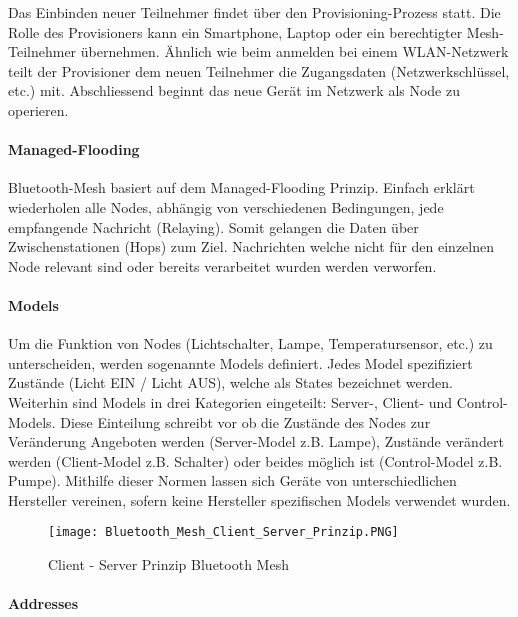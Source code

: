 Das Einbinden neuer Teilnehmer findet über den Provisioning-Prozess statt. Die Rolle des Provisioners kann ein Smartphone, Laptop oder ein berechtigter Mesh-Teilnehmer übernehmen. Ähnlich wie beim anmelden bei einem WLAN-Netzwerk teilt der Provisioner dem neuen Teilnehmer die Zugangsdaten (Netzwerkschlüssel, etc.) mit. Abschliessend beginnt das neue Gerät im Netzwerk als Node zu operieren. 

\paragraph{Managed-Flooding}

Bluetooth-Mesh basiert auf dem Managed-Flooding Prinzip. Einfach erklärt wiederholen alle Nodes, abhängig von verschiedenen Bedingungen, jede empfangende Nachricht (Relaying). Somit gelangen die Daten über Zwischenstationen (Hops) zum Ziel. Nachrichten welche nicht für den einzelnen Node relevant sind oder bereits verarbeitet wurden werden verworfen.

\paragraph{Models}

Um die Funktion von Nodes (Lichtschalter, Lampe, Temperatursensor, etc.) zu unterscheiden, werden sogenannte Models definiert. Jedes Model spezifiziert Zustände (Licht EIN / Licht AUS), welche als States bezeichnet werden. Weiterhin sind Models in drei Kategorien eingeteilt: Server-, Client- und Control-Models. Diese Einteilung schreibt vor ob die Zustände des Nodes zur Veränderung Angeboten werden (Server-Model z.B. Lampe), Zustände verändert werden (Client-Model z.B. Schalter) oder beides möglich ist (Control-Model z.B. Pumpe). Mithilfe dieser Normen lassen sich Geräte von unterschiedlichen Hersteller vereinen, sofern keine Hersteller spezifischen Models verwendet wurden. 

\begin{figure} [H]
	\centering
	\texttt{[image: Bluetooth\_Mesh\_Client\_Server\_Prinzip.PNG]}
	\caption{Client - Server Prinzip Bluetooth Mesh \cite{bluetooth_sig_mesh-technology-overviewpdf_2020}} 
	\label{fig:BTMeshClientServerPrinzip}
\end{figure}

\paragraph{Addresses}

